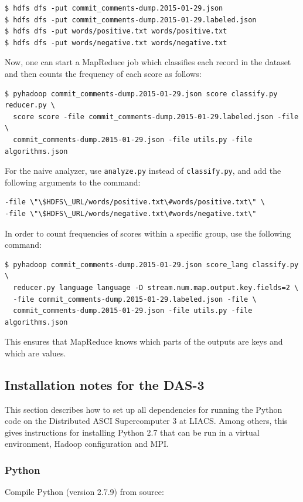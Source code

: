 \documentclass{article}
\begin{document}
\begin{verbatim}
$ hdfs dfs -put commit_comments-dump.2015-01-29.json
$ hdfs dfs -put commit_comments-dump.2015-01-29.labeled.json
$ hdfs dfs -put words/positive.txt words/positive.txt
$ hdfs dfs -put words/negative.txt words/negative.txt
\end{verbatim}

Now, one can start a MapReduce job which classifies each record in the dataset 
and then counts the frequency of each score as follows:

\begin{verbatim}
$ pyhadoop commit_comments-dump.2015-01-29.json score classify.py reducer.py \
  score score -file commit_comments-dump.2015-01-29.labeled.json -file \
  commit_comments-dump.2015-01-29.json -file utils.py -file algorithms.json
\end{verbatim}

For the naive analyzer, use \texttt{analyze.py} instead of 
\texttt{classify.py}, and add the following arguments to the 
command:
\begin{verbatim}
-file \"\$HDFS\_URL/words/positive.txt\#words/positive.txt\" \
-file \"\$HDFS\_URL/words/negative.txt\#words/negative.txt\"
\end{verbatim}

In order to count frequencies of scores within a specific group, use the 
following command:

\begin{verbatim}
$ pyhadoop commit_comments-dump.2015-01-29.json score_lang classify.py \
  reducer.py language language -D stream.num.map.output.key.fields=2 \
  -file commit_comments-dump.2015-01-29.labeled.json -file \
  commit_comments-dump.2015-01-29.json -file utils.py -file algorithms.json
\end{verbatim}

This ensures that MapReduce knows which parts of the outputs are keys and which 
are values.

\subsection{Installation notes for the DAS-3}\label{app:installation-notes}
This section describes how to set up all dependencies for running the Python
code on the Distributed ASCI Supercomputer 3 at LIACS\@. Among others, this
gives instructions for installing Python 2.7 that can be run in a virtual
environment, Hadoop configuration and MPI.

\subsubsection{Python}\label{app:python}
Compile Python (version 2.7.9) from source:
\end{document}

